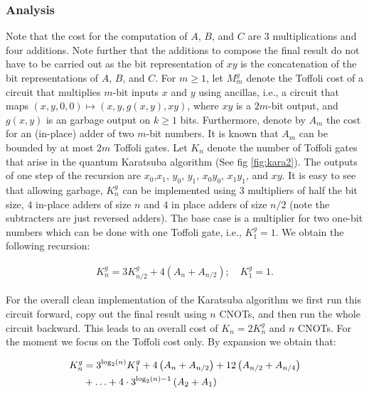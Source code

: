     \subsubsection{Analysis}%

      Note that the cost for the computation of $A$, $B$, and $C$ are $3$
      multiplications and four additions.  Note further that the additions to
      compose the final result do not have to be carried out as the bit
      representation of $xy$ is the concatenation of the bit representations of
      $A$, $B$, and $C$.  For $m\geq 1$, let $M^{g}_m$ denote the Toffoli cost
      of a circuit that multiplies $m$-bit inputs $x$ and $y$ using ancillas,
      i.e., a circuit that maps $(x, y, 0, 0) \mapsto (x, y, g(x,y), xy)$,
      where $xy$ is a $2m$-bit output, and $g(x,y)$ is an garbage output on
      $k\geq 1$ bits.  Furthermore, denote by $A_m$ the cost for an (in-place)
      adder of two $m$-bit numbers.  It is known that $A_m$ can be bounded by
      at most $2m$ Toffoli gates. Let $K_n$ denote the number of Toffoli gates
      that arise in the quantum Karatsuba algorithm (See fig \cref{fig:kara2}).
      The outputs of one step of the recursion are $x_0$,$x_1$, $y_0$, $y_1$,
      $x_0y_0$, $x_1 y_1$, and $xy$.  It is easy to see that allowing garbage,
      $K_n^g$ can be implemented using $3$ multipliers of half the bit size,
      $4$ in-place adders of size $n$ and $4$ in place adders of size $n/2$
      (note the subtracters are just reversed adders).  The base case is a
      multiplier for two one-bit numbers which can be done with one Toffoli
      gate, i.e., $K_1^{g}=1$.  We obtain the following recursion:

      \begin{align}
        K_n^{g} = 3 K_{n/2}^{g} + 4 \left(A_{n} + A_{n/2}\right); \quad K_1^{g}=1.
      \end{align}

      For the overall clean implementation of the Karatsuba algorithm we first
      run this circuit forward, copy out the final result using $n$ CNOTs, and
      then run the whole circuit backward.  This leads to an overall cost of
      $K_n = 2 K_n^{g}$ and $n$ CNOTs.  For the moment we focus on the Toffoli
      cost only.  By expansion we obtain that:

      \begin{align}
        K_n^{g} &= 3^{\log_2(n)} K_1^{g} + 4\left( A_{n}+ A_{n/2} \right) + 12\left( A_{n/2}+ A_{n/4} \right)\notag\\
                & + \ldots + 4 \cdot 3^{\log_2(n)-1} \left(A_2 + A_1\right)
      \end{align}

